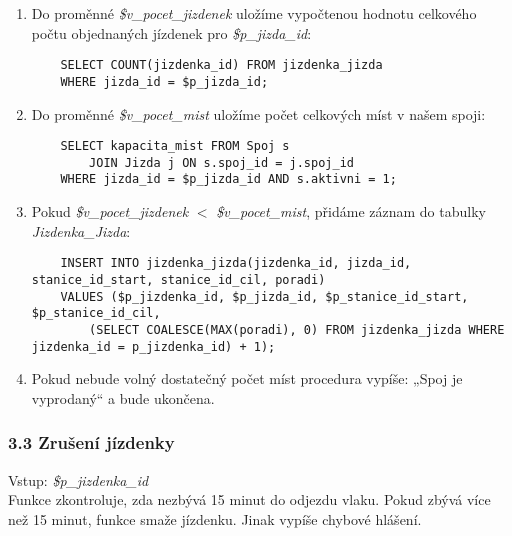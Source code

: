 \documentclass[11pt]{article}
\begin{document}
\begin{enumerate}
    \item Do proměnné \textit{\$v\_pocet\_jizdenek} uložíme vypočtenou hodnotu celkového počtu objednaných jízdenek pro \textit{\$p\_jizda\_id}:
    \begin{lstlisting}
    SELECT COUNT(jizdenka_id) FROM jizdenka_jizda
    WHERE jizda_id = $p_jizda_id;
    \end{lstlisting}

    \item Do proměnné \textit{\$v\_pocet\_mist} uložíme počet celkových míst v našem spoji:
    \begin{lstlisting}
    SELECT kapacita_mist FROM Spoj s
        JOIN Jizda j ON s.spoj_id = j.spoj_id
    WHERE jizda_id = $p_jizda_id AND s.aktivni = 1;
    \end{lstlisting}

    \item Pokud \textit{\$v\_pocet\_jizdenek} $<$ \textit{\$v\_pocet\_mist}, přidáme záznam do tabulky \textit{Jizdenka\_Jizda}:
    \begin{lstlisting}
    INSERT INTO jizdenka_jizda(jizdenka_id, jizda_id, stanice_id_start, stanice_id_cil, poradi)
    VALUES ($p_jizdenka_id, $p_jizda_id, $p_stanice_id_start, $p_stanice_id_cil, 
        (SELECT COALESCE(MAX(poradi), 0) FROM jizdenka_jizda WHERE jizdenka_id = p_jizdenka_id) + 1);
    \end{lstlisting}

    \item Pokud nebude volný dostatečný počet míst procedura vypíše: „Spoj je vyprodaný“ a bude ukončena.
\end{enumerate}


\subsubsection*{3.3 Zrušení jízdenky}
Vstup: \textit{\$p\_jizdenka\_id}\\
Funkce zkontroluje, zda nezbývá 15 minut do odjezdu vlaku. Pokud zbývá více než 15 minut, funkce smaže jízdenku. Jinak vypíše chybové hlášení.
\end{document}
